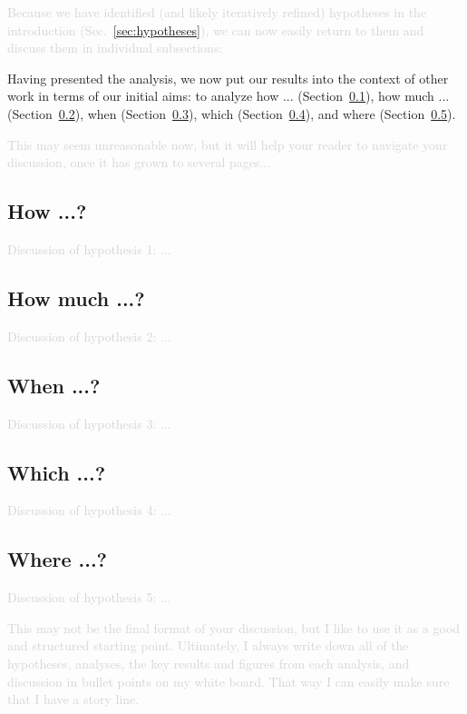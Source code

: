 \documentclass[twocolumn,apj,numberedappendix,appendixfloats]{openjournal}
\newcommand{\comment}[1]{\textcolor{lightgray}{#1}}
\begin{document}
{\comment{Because we have identified (and likely iteratively refined) hypotheses in the introduction (Sec.~\ref{sec:hypotheses}), we can now easily return to them and discuss them in individual subsections:}

Having presented the analysis, we now put our results into the context of other work in terms of our initial aims: to analyze how ... (Section~\ref{sec:discussion_hypothesis1}), how much ...  (Section~\ref{sec:discussion_hypothesis2}), when (Section~\ref{sec:discussion_hypothesis3}), which (Section~\ref{sec:discussion_hypothesis4}), and where (Section~\ref{sec:discussion_hypothesis5}).

\comment{This may seem unreasonable now, but it will help your reader to navigate your discussion, once it has grown to several pages...}

\subsection{How ...?} \label{sec:discussion_hypothesis1}

\comment{Discussion of hypothesis 1: ...}

\subsection{How much ...?} \label{sec:discussion_hypothesis2}

\comment{Discussion of hypothesis 2: ...}

\subsection{When ...?} \label{sec:discussion_hypothesis3}

\comment{Discussion of hypothesis 3: ...}

\subsection{Which ...?} \label{sec:discussion_hypothesis4}

\comment{Discussion of hypothesis 4: ...}

\subsection{Where ...?} \label{sec:discussion_hypothesis5}

\comment{Discussion of hypothesis 5: ...}


\comment{This may not be the final format of your discussion, but I like to use it as a good and structured starting point. Ultimately, I always write down all of the hypotheses, analyses, the key results and figures from each analysis, and discussion in bullet points on my white board. That way I can easily make sure that I have a story line.}

}
\end{document}
